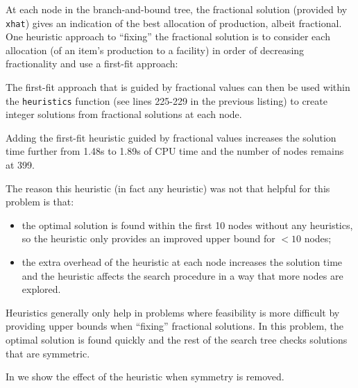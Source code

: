 \newpage

At each node in the branch-and-bound tree, the fractional solution (provided by \texttt{xhat}) gives an indication of the best allocation of production, albeit fractional. One heuristic approach to ``fixing'' the fractional solution is to consider each allocation (of an item's production to a facility) in order of decreasing fractionality and use a first-fit approach:

\newpage


The first-fit approach that is guided by fractional values can then be used within the \texttt{heuristics} function (see lines 225-229 in the previous listing) to create integer solutions from fractional solutions at each node.

Adding the first-fit heuristic guided by fractional values increases the solution time further from 1.48s to 1.89s of CPU time and the number of nodes remains at 399.

The reason this heuristic (in fact any heuristic) was not that helpful for this problem is that:
\begin{itemize}
\item the optimal solution is found within the first 10 nodes without any heuristics, so the heuristic only provides an improved upper bound for $< 10$ nodes;
\item the extra overhead of the heuristic at each node increases the solution time and the heuristic affects the search procedure in a way that more nodes are explored.
\end{itemize}

Heuristics generally only help in problems where feasibility is more difficult by providing upper bounds when ``fixing'' fractional solutions. In this problem, the optimal solution is found quickly and the rest of the search tree checks solutions that are symmetric.

In  we show the effect of the heuristic when symmetry is removed.

\begin{comment}
\subsection{Customised Heuristics for the Wedding Planner problem} \label{sbs:wed_heur}
\end{comment}